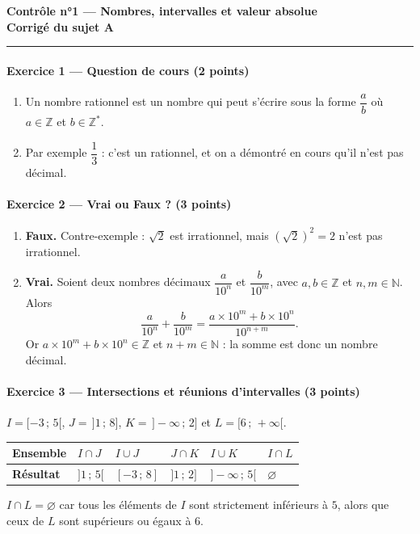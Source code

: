 \documentclass[11pt,a4paper]{article}
\newcommand{\N}{\mathbb{N}}
\newcommand{\Z}{\mathbb{Z}}
\newcommand{\exo}[3]{\paragraph{Exercice #1 --- #2 \hfill\normalfont\small(#3 points)}}
\newcommand{\rep}[1]{\textbf{#1}}
\newcommand{\entete}[1]{%
  \begin{center}
    {\Large\bfseries Contrôle n°1 --- Nombres, intervalles et valeur absolue}\\[0.4em]
    {\large\bfseries Corrigé du sujet #1}
  \end{center}
  \vspace{0.2em}
  \hrule
  \vspace{0.3em}
}
\newcommand{\tableauintervalles}[5]{%
  \begin{center}
  \renewcommand{\arraystretch}{1.5}
  \begin{tabularx}{\linewidth}{|>{\centering\arraybackslash}m{2.4cm}|*{5}{>{\centering\arraybackslash}X|}}
    \hline
    \textbf{Ensemble} & $I\cap J$ & $I\cup J$ & $J\cap K$ & $I\cup K$ & $I\cap L$ \\
    \hline
    \textbf{Résultat} & $#1$ & $#2$ & $#3$ & $#4$ & $#5$ \\
    \hline
  \end{tabularx}
  \end{center}
}
\begin{document}
\entete{A}

\exo{1}{Question de cours}{2}
\begin{enumerate}[label=\alph*), itemsep=0.2em, topsep=0.2em]
  \item Un nombre rationnel est un nombre qui peut s'écrire sous la forme $\dfrac{a}{b}$ où $a \in \Z$ et $b \in \Z^*$.
  \item Par exemple $\dfrac{1}{3}$ : c'est un rationnel, et on a démontré en cours qu'il n'est pas décimal.
\end{enumerate}

\exo{2}{Vrai ou Faux ?}{3}
\begin{enumerate}[label=\alph*), itemsep=0.4em, topsep=0.2em]
  \item \rep{Faux.} Contre-exemple : $\sqrt{2}$ est irrationnel, mais $\left(\sqrt{2}\right)^2 = 2$ n'est pas irrationnel.
  \item \rep{Vrai.} Soient deux nombres décimaux $\dfrac{a}{10^n}$ et $\dfrac{b}{10^m}$, avec $a, b \in \Z$ et $n, m \in \N$. Alors
  \[ \dfrac{a}{10^n} + \dfrac{b}{10^m} = \dfrac{a \times 10^m + b \times 10^n}{10^{n+m}}. \]
  Or $a \times 10^m + b \times 10^n \in \Z$ et $n + m \in \N$ : la somme est donc un nombre décimal.
\end{enumerate}

\exo{3}{Intersections et réunions d'intervalles}{3}
$I = [-3\,;\,5[$, \quad $J = \,]1\,;\,8]$, \quad $K = \,]-\infty\,;\,2]$ \quad et \quad $L = [6\,;\,+\infty[$.
\tableauintervalles{]1\,;\,5[}{[-3\,;\,8]}{]1\,;\,2]}{]-\infty\,;\,5[}{\varnothing}
$I \cap L = \varnothing$ car tous les éléments de $I$ sont strictement inférieurs à $5$, alors que ceux de $L$ sont supérieurs ou égaux à $6$.
\end{document}
